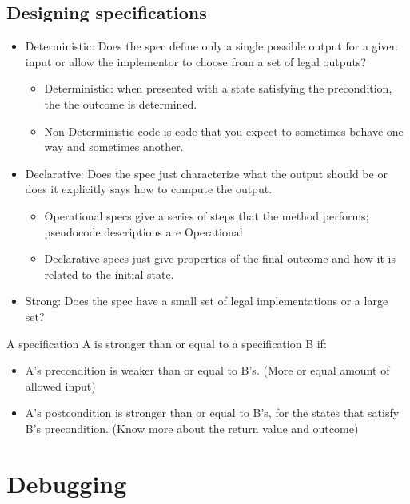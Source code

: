 \documentclass[letterpaper,12pt]{article}
\begin{document}
\subsection{Designing specifications}
\begin{itemize}
      \item Deterministic: Does the spec define only a single possible output for a given
            input or allow the implementor to choose from a set of legal outputs?
            \begin{itemize}
                  \item Deterministic: when presented with a state satisfying the precondition, the
                        the outcome is determined.
                  \item Non-Deterministic code is code that you expect to sometimes behave one way and
                        sometimes another.
            \end{itemize}
      \item Declarative: Does the spec just characterize what the output should be or does
            it explicitly says how to compute the output.
            \begin{itemize}
                  \item Operational specs give a series of steps that the method performs; pseudocode
                        descriptions are Operational
                  \item Declarative specs just give properties of the final outcome and how it is
                        related to the initial state.
            \end{itemize}
      \item Strong: Does the spec have a small set of legal implementations or a large set?
\end{itemize}

A specification A is stronger than or equal to a specification B if:
\begin{itemize}
      \item A's precondition is weaker than or equal to B's. (More or equal amount of
            allowed input)
      \item A's postcondition is stronger than or equal to B's, for the states that satisfy
            B's precondition. (Know more about the return value and outcome)
\end{itemize}

\section{Debugging}
\end{document}
